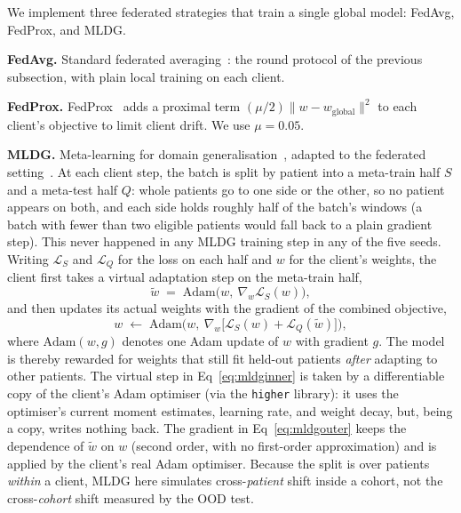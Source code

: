 \documentclass[10pt,letterpaper]{article}
\begin{document}
We implement three federated strategies that train a single global model:
FedAvg, FedProx, and MLDG.

\textbf{FedAvg.} Standard federated averaging~\cite{mcmahan2017fedavg}: the
round protocol of the previous subsection, with plain local training on each
client.

\textbf{FedProx.} FedProx~\cite{li2020fedprox} adds
a proximal term $(\mu/2)\lVert w - w_{\text{global}}\rVert^2$ to each client's
objective to limit client drift. We use $\mu=0.05$.

\textbf{MLDG.} Meta-learning for domain generalisation~\cite{li2018mldg},
adapted to the federated setting~\cite{liu2021feddg}. At each client step, the batch is split by
patient into a meta-train half $S$ and a meta-test half $Q$: whole patients go
to one side or the other, so no patient appears on both, and each side holds
roughly half of the batch's windows (a batch with fewer than two eligible
patients would fall back to a plain gradient step). This never happened in
any MLDG training step in any of the five seeds. Writing
$\mathcal{L}_S$ and $\mathcal{L}_Q$ for the loss on each half and $w$ for the
client's weights, the client first takes a virtual adaptation step on the
meta-train half,
\begin{equation}\label{eq:mldginner}
\tilde{w} \;=\; \mathrm{Adam}\big(w,\ \nabla_w \mathcal{L}_S(w)\big),
\end{equation}
and then updates its actual weights with the gradient of the combined
objective,
\begin{equation}\label{eq:mldgouter}
w \;\leftarrow\; \mathrm{Adam}\big(w,\ \nabla_w\big[\mathcal{L}_S(w) +
\mathcal{L}_Q(\tilde{w})\big]\big),
\end{equation}
where $\mathrm{Adam}(w, g)$ denotes one Adam update of $w$ with gradient $g$.
The model is thereby rewarded for weights that still fit held-out patients
\emph{after} adapting to other patients. The virtual step in
Eq~\eqref{eq:mldginner} is taken by a differentiable copy of the client's Adam
optimiser (via the \texttt{higher} library): it uses the optimiser's current
moment estimates, learning rate, and weight decay, but, being a copy,
writes nothing back. The gradient in Eq~\eqref{eq:mldgouter} keeps the
dependence of $\tilde{w}$ on $w$ (second order, with no first-order approximation)
and is applied by the client's real Adam optimiser. Because the split is over
patients \emph{within} a client, MLDG here simulates cross-\emph{patient}
shift inside a cohort, not the cross-\emph{cohort} shift measured by the OOD
test.
\end{document}
